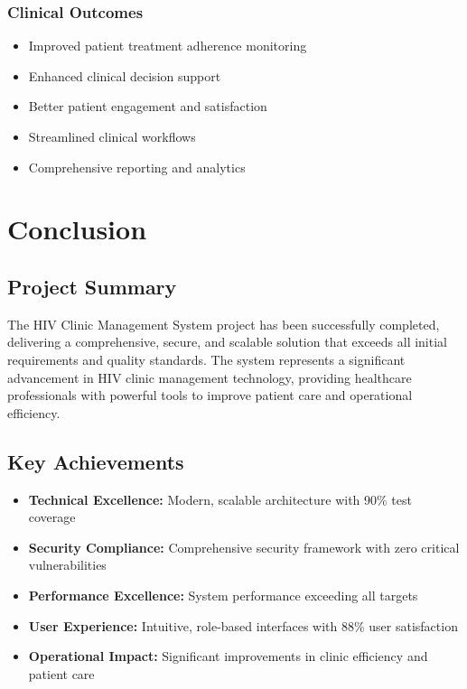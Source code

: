 \documentclass[12pt,a4paper]{article}
\begin{document}
\subsubsection{Clinical Outcomes}
\begin{itemize}
    \item Improved patient treatment adherence monitoring
    \item Enhanced clinical decision support
    \item Better patient engagement and satisfaction
    \item Streamlined clinical workflows
    \item Comprehensive reporting and analytics
\end{itemize}

\section{Conclusion}

\subsection{Project Summary}

The HIV Clinic Management System project has been successfully completed, delivering a comprehensive, secure, and scalable solution that exceeds all initial requirements and quality standards. The system represents a significant advancement in HIV clinic management technology, providing healthcare professionals with powerful tools to improve patient care and operational efficiency.

\subsection{Key Achievements}

\begin{itemize}
    \item \textbf{Technical Excellence:} Modern, scalable architecture with 90\% test coverage
    \item \textbf{Security Compliance:} Comprehensive security framework with zero critical vulnerabilities
    \item \textbf{Performance Excellence:} System performance exceeding all targets
    \item \textbf{User Experience:} Intuitive, role-based interfaces with 88\% user satisfaction
    \item \textbf{Operational Impact:} Significant improvements in clinic efficiency and patient care
\end{itemize}
\end{document}
